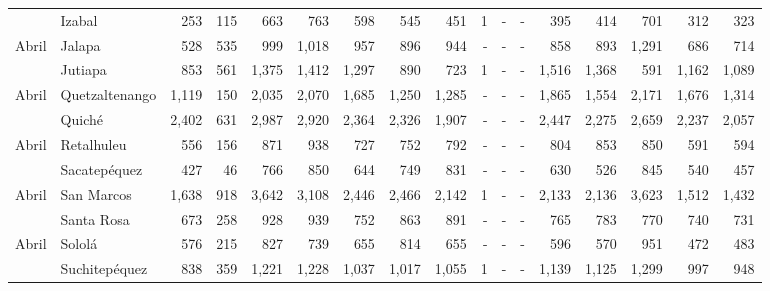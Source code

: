 \begin{landscape}
\begin{center}
\begin{longtable}{llrrrrrrrrrrrrrrr}
\rowcolor{color1!5!white}\multicolumn{1}{l}{	\footnotesize	 Abril 	}&	 Izabal 	&	 253 	&	 115 	&	 663 	&	 763 	&	 598 	&	 545 	&	 451 	&	 1 	&	 -   	&	 -   	&	 395 	&	 414 	&	 701 	&	 312 	&	 323 	\\
\multicolumn{1}{l}{	\footnotesize	 Abril 	}&	 Jalapa 	&	 528 	&	 535 	&	 999 	&	 1,018 	&	 957 	&	 896 	&	 944 	&	 -   	&	 -   	&	 -   	&	 858 	&	 893 	&	 1,291 	&	 686 	&	 714 	\\
\rowcolor{color1!5!white}\multicolumn{1}{l}{	\footnotesize	 Abril 	}&	 Jutiapa 	&	 853 	&	 561 	&	 1,375 	&	 1,412 	&	 1,297 	&	 890 	&	 723 	&	 1 	&	 -   	&	 -   	&	 1,516 	&	 1,368 	&	 591 	&	 1,162 	&	 1,089 	\\
\multicolumn{1}{l}{	\footnotesize	 Abril 	}&	 Quetzaltenango 	&	 1,119 	&	 150 	&	 2,035 	&	 2,070 	&	 1,685 	&	 1,250 	&	 1,285 	&	 -   	&	 -   	&	 -   	&	 1,865 	&	 1,554 	&	 2,171 	&	 1,676 	&	 1,314 	\\
\rowcolor{color1!5!white}\multicolumn{1}{l}{	\footnotesize	 Abril 	}&	 Quiché 	&	 2,402 	&	 631 	&	 2,987 	&	 2,920 	&	 2,364 	&	 2,326 	&	 1,907 	&	 -   	&	 -   	&	 -   	&	 2,447 	&	 2,275 	&	 2,659 	&	 2,237 	&	 2,057 	\\
\multicolumn{1}{l}{	\footnotesize	 Abril 	}&	 Retalhuleu 	&	 556 	&	 156 	&	 871 	&	 938 	&	 727 	&	 752 	&	 792 	&	 -   	&	 -   	&	 -   	&	 804 	&	 853 	&	 850 	&	 591 	&	 594 	\\
\rowcolor{color1!5!white}\multicolumn{1}{l}{	\footnotesize	 Abril 	}&	 Sacatepéquez 	&	 427 	&	 46 	&	 766 	&	 850 	&	 644 	&	 749 	&	 831 	&	 -   	&	 -   	&	 -   	&	 630 	&	 526 	&	 845 	&	 540 	&	 457 	\\
\multicolumn{1}{l}{	\footnotesize	 Abril 	}&	 San Marcos 	&	 1,638 	&	 918 	&	 3,642 	&	 3,108 	&	 2,446 	&	 2,466 	&	 2,142 	&	 1 	&	 -   	&	 -   	&	 2,133 	&	 2,136 	&	 3,623 	&	 1,512 	&	 1,432 	\\
\rowcolor{color1!5!white}\multicolumn{1}{l}{	\footnotesize	 Abril 	}&	 Santa Rosa 	&	 673 	&	 258 	&	 928 	&	 939 	&	 752 	&	 863 	&	 891 	&	 -   	&	 -   	&	 -   	&	 765 	&	 783 	&	 770 	&	 740 	&	 731 	\\
\multicolumn{1}{l}{	\footnotesize	 Abril 	}&	 Sololá 	&	 576 	&	 215 	&	 827 	&	 739 	&	 655 	&	 814 	&	 655 	&	 -   	&	 -   	&	 -   	&	 596 	&	 570 	&	 951 	&	 472 	&	 483 	\\
\rowcolor{color1!5!white}\multicolumn{1}{l}{	\footnotesize	 Abril 	}&	 Suchitepéquez 	&	 838 	&	 359 	&	 1,221 	&	 1,228 	&	 1,037 	&	 1,017 	&	 1,055 	&	 1 	&	 -   	&	 -   	&	 1,139 	&	 1,125 	&	 1,299 	&	 997 	&	 948 	\\

\end{longtable}
\end{center}
\end{landscape}
